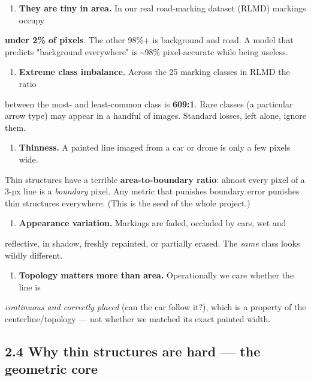 \documentclass[11pt]{article}
\begin{document}
\begin{enumerate}\setlength{\itemsep}{1pt}
\item \textbf{They are tiny in area.} In our real road-marking dataset (RLMD) markings occupy
\end{enumerate}
   \textbf{under 2\% of pixels}. The other 98\%+ is background and road. A model that    predicts "background everywhere" is \textasciitilde{}98\% pixel-accurate while being useless.

\begin{enumerate}\setlength{\itemsep}{1pt}
\item \textbf{Extreme class imbalance.} Across the 25 marking classes in RLMD the ratio
\end{enumerate}
   between the most- and least-common class is \textbf{609:1}. Rare classes (a particular    arrow type) may appear in a handful of images. Standard losses, left alone, ignore    them.

\begin{enumerate}\setlength{\itemsep}{1pt}
\item \textbf{Thinness.} A painted line imaged from a car or drone is only a few pixels wide.
\end{enumerate}
   Thin structures have a terrible \textbf{area-to-boundary ratio}: almost every pixel of    a 3-px line is a \textit{boundary} pixel. Any metric that punishes boundary error    punishes thin structures everywhere. (This is the seed of the whole project.)

\begin{enumerate}\setlength{\itemsep}{1pt}
\item \textbf{Appearance variation.} Markings are faded, occluded by cars, wet and
\end{enumerate}
   reflective, in shadow, freshly repainted, or partially erased. The \textit{same} class    looks wildly different.

\begin{enumerate}\setlength{\itemsep}{1pt}
\item \textbf{Topology matters more than area.} Operationally we care whether the line is
\end{enumerate}
   \textit{continuous and correctly placed} (can the car follow it?), which is a property of    the centerline/topology --- not whether we matched its exact painted width.

\subsection*{2.4 Why thin structures are hard --- the geometric core}
\end{document}
